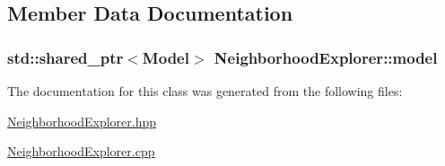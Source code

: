 \subsection{Member Data Documentation}
\hypertarget{class_neighborhood_explorer_aa4da40077758b18ef280c1fba3d9092e}{
\subsubsection[{model}]{\setlength{\rightskip}{0pt plus 5cm}std\-::shared\-\_\-ptr$<${\bf Model}$>$ Neighborhood\-Explorer\-::model}}\label{class_neighborhood_explorer_aa4da40077758b18ef280c1fba3d9092e}


The documentation for this class was generated from the following files\-:\begin{DoxyCompactItemize}
\item 
\hyperlink{_neighborhood_explorer_8hpp}{Neighborhood\-Explorer.\-hpp}\item 
\hyperlink{_neighborhood_explorer_8cpp}{Neighborhood\-Explorer.\-cpp}\end{DoxyCompactItemize}
